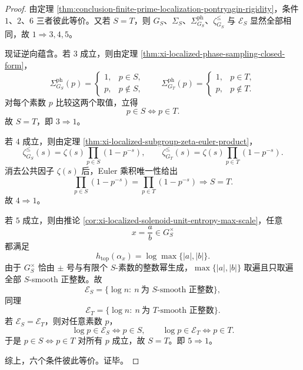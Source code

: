 \begin{proof}
由定理 \ref{thm:conclusion-finite-prime-localization-pontryagin-rigidity}，条件 \(1\)、\(2\)、\(6\) 三者彼此等价。又若 \(S=T\)，则 \(G_S\)、\(\Sigma_S\)、\(\Sigma^{\mathrm{ph}}_{G_S}\)、\(\zeta_{G_S}^{\le}\) 与 \(\mathscr E_S\) 显然全部相同，故 \(1\Rightarrow 3,4,5\)。

现证逆向蕴含。若 \(3\) 成立，则由定理 \ref{thm:xi-localized-phase-sampling-closed-form}，
\[
\Sigma^{\mathrm{ph}}_{G_S}(p)=
\begin{cases}
1,& p\in S,\\
p,& p\notin S,
\end{cases}
\qquad
\Sigma^{\mathrm{ph}}_{G_T}(p)=
\begin{cases}
1,& p\in T,\\
p,& p\notin T.
\end{cases}
\]
对每个素数 \(p\) 比较这两个取值，立得
\[
p\in S\iff p\in T.
\]
故 \(S=T\)，即 \(3\Rightarrow 1\)。

若 \(4\) 成立，则由定理 \ref{thm:xi-localized-subgroup-zeta-euler-product}，
\[
\zeta_{G_S}^{\le}(s)=\zeta(s)\prod_{p\in S}(1-p^{-s}),
\qquad
\zeta_{G_T}^{\le}(s)=\zeta(s)\prod_{p\in T}(1-p^{-s}).
\]
消去公共因子 \(\zeta(s)\) 后，Euler 乘积唯一性给出
\[
\prod_{p\in S}(1-p^{-s})=\prod_{p\in T}(1-p^{-s})
\Longrightarrow
S=T.
\]
故 \(4\Rightarrow 1\)。

若 \(5\) 成立，则由推论 \ref{cor:xi-localized-solenoid-unit-entropy-max-scale}，任意
\[
x=\frac{a}{b}\in G_S^\times
\]
都满足
\[
h_{\mathrm{top}}(\alpha_x)=\log\max\{|a|,|b|\}.
\]
由于 \(G_S^\times\) 恰由 \(\pm\) 号与有限个 \(S\)-素数的整数幂生成，\(\max\{|a|,|b|\}\) 取遍且只取遍全部 \(S\)-smooth 正整数。故
\[
\mathscr E_S=\{\log n:\ n\ \text{为 }S\text{-smooth 正整数}\},
\]
同理
\[
\mathscr E_T=\{\log n:\ n\ \text{为 }T\text{-smooth 正整数}\}.
\]
若 \(\mathscr E_S=\mathscr E_T\)，则对任意素数 \(p\)，
\[
\log p\in \mathscr E_S
\iff
p\in S,
\qquad
\log p\in \mathscr E_T
\iff
p\in T.
\]
于是 \(p\in S\iff p\in T\) 对所有 \(p\) 成立，故 \(S=T\)。即 \(5\Rightarrow 1\)。

综上，六个条件彼此等价。证毕。
\end{proof}

